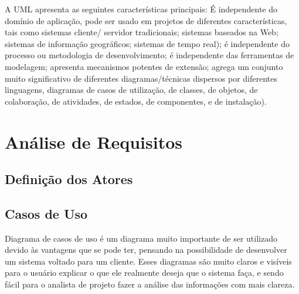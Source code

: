 A UML apresenta as seguintes características principais:
É independente do domínio de aplicação, pode ser usado em projetos de diferentes características, tais como sistemas cliente/
servidor tradicionais; sistemas baseados na Web; sistemas de informação geográficos; sistemas de tempo real); é independente do processo ou metodologia de desenvolvimento; é independente das ferramentas de modelagem; apresenta mecanismos potentes de extensão; agrega um conjunto muito significativo de diferentes
diagramas/técnicas dispersos por diferentes linguagens, diagramas de casos de utilização, de classes, de objetos, de colaboração, de 
atividades, de estados, de componentes, e de instalação). \cite{Alberto}

\section{Análise de Requisitos}
\label{sec:anareq}
\subsection{Definição dos Atores}
\label{sec:casuso}

\subsection{Casos de Uso}
\label{sec:casuso}
Diagrama de casos de uso é um diagrama muito importante de ser utilizado devido às vantagens que se pode ter, pensando na possibilidade de desenvolver um sistema voltado para um cliente. Esses diagramas são muito claros e visíveis para o usuário explicar o que ele realmente deseja que o sistema faça, e sendo fácil para o analista de projeto fazer a análise das informações com mais clareza.

